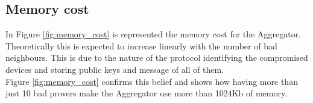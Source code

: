 \subsection{Memory cost}
In Figure \ref{fig:memory_cost} is represented the memory cost for the Aggregator.
Theoretically this is expected to increase linearly with the number of bad neighbours. This is due to the nature of the protocol identifying the compromised devices and storing public keys and message of all of them.\\
Figure \ref{fig:memory_cost} confirms this belief and shows how having more than just 10 bad provers make the Aggregator use more than 1024Kb of memory.\\


